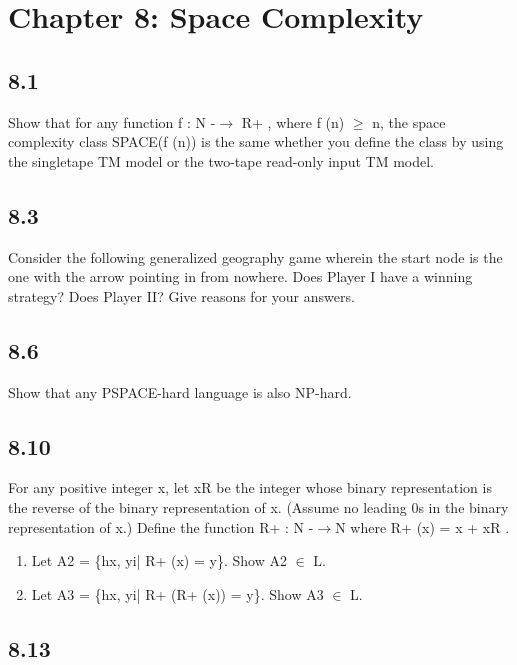 \section{Chapter 8: Space Complexity}

\subsection*{8.1}

Show that for any function f : N -$\to$ R+ , where f (n) $\ge$ n, the space complexity class SPACE(f (n)) is the same whether you define the class by using the singletape TM model or the two-tape read-only input TM model.


\subsection*{8.3}

Consider the following generalized geography game wherein the start node is the one with the arrow pointing in from nowhere. Does Player I have a winning strategy? Does Player II? Give reasons for your answers.


\subsection*{8.6}

Show that any PSPACE-hard language is also NP-hard.


\subsection*{8.10}

For any positive integer x, let xR be the integer whose binary representation is the reverse of the binary representation of x. (Assume no leading 0s in the binary representation of x.) Define the function R+ : N -$\to$N where R+ (x) = x + xR .

\begin{enumerate}[label=(\alph*), leftmargin=2.5em]

\item Let A2 = \{hx, yi| R+ (x) = y\}. Show A2 $\in$ L.

\item Let A3 = \{hx, yi| R+ (R+ (x)) = y\}. Show A3 $\in$ L.

\end{enumerate}


\subsection*{8.13}

